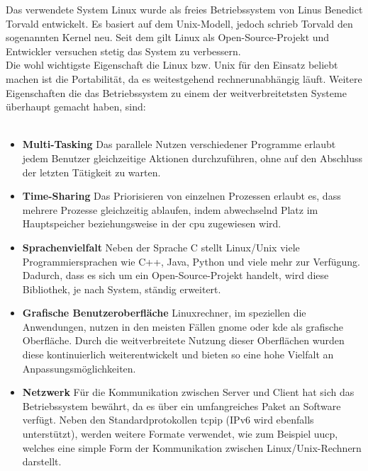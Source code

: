 Das verwendete System Linux wurde als freies Betriebssystem von Linus Benedict Torvald entwickelt.
Es basiert auf dem Unix-Modell, jedoch schrieb Torvald den sogenannten Kernel neu. Seit dem gilt
Linux als Open-Source-Projekt und Entwickler versuchen stetig das System zu verbessern.\cite{linux}\\
Die wohl wichtigste Eigenschaft die Linux bzw. Unix für den Einsatz beliebt machen ist die Portabilität,
da es weitestgehend rechnerunabhängig läuft. Weitere Eigenschaften die das Betriebssystem zu einem der
 weitverbreitetsten Systeme überhaupt gemacht haben, sind:\\\cite{linux}\\
\begin{itemize}
\item  \textbf{Multi-Tasking} Das parallele Nutzen verschiedener Programme erlaubt jedem Benutzer
        gleichzeitige Aktionen durchzuführen, ohne auf den Abschluss der letzten Tätigkeit zu warten.
\item  \textbf{Time-Sharing} Das Priorisieren von einzelnen Prozessen erlaubt es, dass mehrere
        Prozesse gleichzeitig ablaufen, indem abwechselnd Platz im Hauptspeicher beziehungsweise in der \ac{cpu}
        zugewiesen wird.
\item \textbf{Sprachenvielfalt} Neben der Sprache C stellt Linux/Unix viele Programmiersprachen
      wie C++, Java, Python und viele mehr zur Verfügung. Dadurch, dass es sich um ein Open-Source-Projekt handelt,
      wird diese Bibliothek, je nach System, ständig erweitert.
\item \textbf{Grafische Benutzeroberfläche} Linuxrechner, im speziellen die Anwendungen, nutzen in
      den meisten Fällen \ac{gnome} oder \ac{kde} als grafische Oberfläche. Durch die weitverbreitete Nutzung
      dieser Oberflächen wurden diese kontinuierlich weiterentwickelt und bieten so eine hohe Vielfalt an
      Anpassungsmöglichkeiten.
\item \textbf{Netzwerk} Für die Kommunikation zwischen Server und Client hat sich das Betriebssystem bewährt,
      da es über ein umfangreiches Paket an Software verfügt. Neben den Standardprotokollen \ac{tcpip} (IPv6 wird
      ebenfalls unterstützt), werden weitere Formate verwendet, wie zum Beispiel \ac{uucp}, welches eine simple Form
      der Kommunikation zwischen Linux/Unix-Rechnern darstellt.
\end{itemize}

